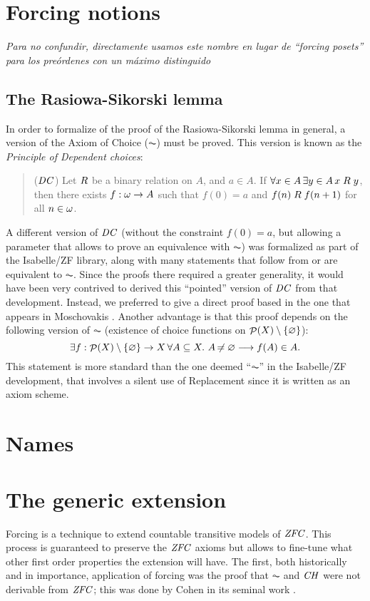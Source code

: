 \documentclass[9pt]{entcs} \usepackage{entcsmacro}
\begin{document}
\section{Forcing notions}\label{sec:forcing-posets}
\textit{Para no confundir, directamente usamos este nombre en lugar de
  ``forcing posets'' para los preórdenes con un máximo distinguido}

\subsection{The Rasiowa-Sikorski lemma}
In order to formalize of the proof of the Rasiowa-Sikorski lemma in
general, a version of the Axiom of Choice ($\AC$) must be proved. This
version is known as the \emph{Principle of Dependent choices}:
\begin{quote}
  ($\mathit{DC}$) Let $\mathrel{R}$ be a binary relation on $A$, and $a\in A$. If
  $\forall x\in A\,  \exists y\in A\, x\mathrel{R} y$, then there exists
  $f:\omega\to A$ such that $f(0)=a$ and $f(n)\mathrel{R} f(n+1)$ for all
  $n\in\omega$.
\end{quote}

A different version of $\mathit{DC}$ (without the constraint $f(0)=a$, but
allowing a parameter that allows to prove an equivalence with $\AC$) was
formalized as part of the Isabelle/ZF library, along with many
statements that follow from or are equivalent to $\AC$. Since the
proofs there required a greater generality, it would have been very
contrived to derived this ``pointed'' version of $\mathit{DC}$ from that
development. Instead, we preferred to give a direct proof based in the
one that appears in Moschovakis \cite{moschovakis1994notes}. Another
advantage is that this proof depends on the following version of $\AC$
(existence of choice functions on $\mathop{\mathcal{P}}(X)\setminus \{\varnothing\}$):
\[
\exists f:\mathop{\mathcal{P}}(X)\setminus \{\varnothing\}\to X \, \forall A\subseteq X.\ A\not\nobreak\mkern -2mu = \varnothing \longrightarrow
f(A) \in A.
\]
This statement is more standard than the one deemed ``$\AC$'' in the
Isabelle/ZF development, that involves a silent use of Replacement
since it is written as an axiom scheme.


\section{Names}


\section{The generic extension}
Forcing is a technique to extend countable transitive models of
$\mathit{ZFC}$. This process is guaranteed to preserve the $\mathit{ZFC}$
axioms but allows to fine-tune what other first order properties the
extension will have. The first, both historically and in importance,
application of forcing was the proof that $\AC$ and $\mathit{CH}$ were not
derivable from $\mathit{ZFC}$; this was done by Cohen in its seminal work
\cite{Cohen-CH-PNAS}.
\end{document}
